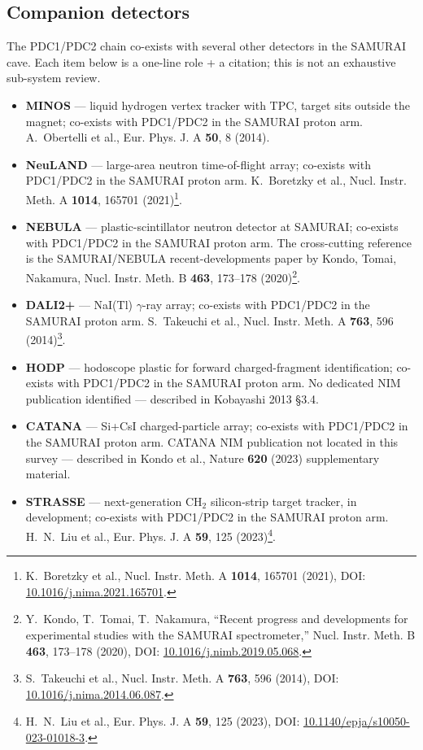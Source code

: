 \documentclass[a4paper, 11pt]{article}
\begin{document}
\subsection{Companion detectors}
The PDC1/PDC2 chain co-exists with several other detectors in the SAMURAI cave. Each item below is a one-line role + a citation; this is not an exhaustive sub-system review.
\begin{itemize}
  \item \textbf{MINOS} --- liquid hydrogen vertex tracker with TPC, target sits outside the magnet; co-exists with PDC1/PDC2 in the SAMURAI proton arm. A.~Obertelli et al., Eur. Phys. J. A \textbf{50}, 8 (2014).
  \item \textbf{NeuLAND} --- large-area neutron time-of-flight array; co-exists with PDC1/PDC2 in the SAMURAI proton arm. K.~Boretzky et al., Nucl. Instr. Meth. A \textbf{1014}, 165701 (2021)\footnote{\label{fn:boretzky2021}K.~Boretzky et al., Nucl. Instr. Meth. A \textbf{1014}, 165701 (2021), DOI: \href{https://doi.org/10.1016/j.nima.2021.165701}{10.1016/j.nima.2021.165701}.}.
  \item \textbf{NEBULA} --- plastic-scintillator neutron detector at SAMURAI; co-exists with PDC1/PDC2 in the SAMURAI proton arm. The cross-cutting reference is the SAMURAI/NEBULA recent-developments paper by Kondo, Tomai, Nakamura, Nucl. Instr. Meth. B \textbf{463}, 173--178 (2020)\footnote{\label{fn:kondo2020nim}Y.~Kondo, T.~Tomai, T.~Nakamura, ``Recent progress and developments for experimental studies with the SAMURAI spectrometer,'' Nucl. Instr. Meth. B \textbf{463}, 173--178 (2020), DOI: \href{https://doi.org/10.1016/j.nimb.2019.05.068}{10.1016/j.nimb.2019.05.068}.}.
  \item \textbf{DALI2+} --- NaI(Tl) $\gamma$-ray array; co-exists with PDC1/PDC2 in the SAMURAI proton arm. S.~Takeuchi et al., Nucl. Instr. Meth. A \textbf{763}, 596 (2014)\footnote{\label{fn:takeuchi2014}S.~Takeuchi et al., Nucl. Instr. Meth. A \textbf{763}, 596 (2014), DOI: \href{https://doi.org/10.1016/j.nima.2014.06.087}{10.1016/j.nima.2014.06.087}.}.
  \item \textbf{HODP} --- hodoscope plastic for forward charged-fragment identification; co-exists with PDC1/PDC2 in the SAMURAI proton arm. No dedicated NIM publication identified --- described in Kobayashi 2013 §3.4.
  \item \textbf{CATANA} --- Si+CsI charged-particle array; co-exists with PDC1/PDC2 in the SAMURAI proton arm. CATANA NIM publication not located in this survey --- described in Kondo et al., Nature \textbf{620} (2023) supplementary material.
  \item \textbf{STRASSE} --- next-generation CH$_2$ silicon-strip target tracker, in development; co-exists with PDC1/PDC2 in the SAMURAI proton arm. H.~N.~Liu et al., Eur. Phys. J. A \textbf{59}, 125 (2023)\footnote{\label{fn:liu2023}H.~N.~Liu et al., Eur. Phys. J. A \textbf{59}, 125 (2023), DOI: \href{https://doi.org/10.1140/epja/s10050-023-01018-3}{10.1140/epja/s10050-023-01018-3}.}.
\end{itemize}
\end{document}
